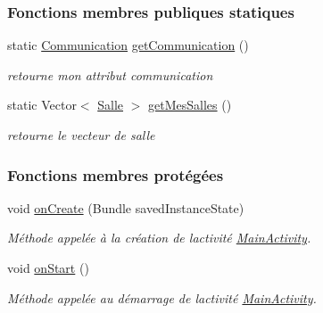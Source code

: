 \subsubsection*{Fonctions membres publiques statiques}
\begin{DoxyCompactItemize}
\item 
static \hyperlink{classcom_1_1lasalle_1_1meeting_1_1_communication}{Communication} \hyperlink{classcom_1_1lasalle_1_1meeting_1_1_main_activity_a625741ceb02451098c8d7e6f95fafa3a}{get\+Communication} ()
\begin{DoxyCompactList}\small\item\em retourne mon attribut communication \end{DoxyCompactList}\item 
static Vector$<$ \hyperlink{classcom_1_1lasalle_1_1meeting_1_1_salle}{Salle} $>$ \hyperlink{classcom_1_1lasalle_1_1meeting_1_1_main_activity_a67d3733d9841e19aae3b52299844bb06}{get\+Mes\+Salles} ()
\begin{DoxyCompactList}\small\item\em retourne le vecteur de salle \end{DoxyCompactList}\end{DoxyCompactItemize}
\subsubsection*{Fonctions membres protégées}
\begin{DoxyCompactItemize}
\item 
void \hyperlink{classcom_1_1lasalle_1_1meeting_1_1_main_activity_a3a6d7cbe7839d1876dff75e4497ed02e}{on\+Create} (Bundle saved\+Instance\+State)
\begin{DoxyCompactList}\small\item\em Méthode appelée à la création de l\textquotesingle{}activité \hyperlink{classcom_1_1lasalle_1_1meeting_1_1_main_activity}{Main\+Activity}. \end{DoxyCompactList}\item 
void \hyperlink{classcom_1_1lasalle_1_1meeting_1_1_main_activity_a09159617fa8f6a5d7b663ba2cf3d65c4}{on\+Start} ()
\begin{DoxyCompactList}\small\item\em Méthode appelée au démarrage de l\textquotesingle{}activité \hyperlink{classcom_1_1lasalle_1_1meeting_1_1_main_activity}{Main\+Activity}. \end{DoxyCompactList}\end{DoxyCompactItemize}
